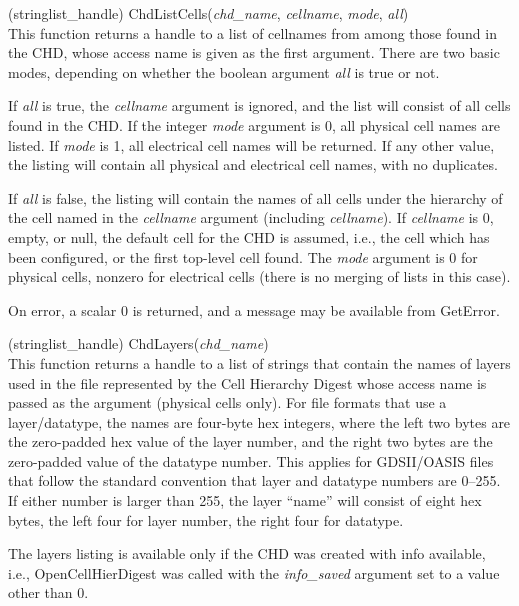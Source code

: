 \begin{description}
\item{(stringlist\_handle) \vt ChdListCells({\it chd\_name\/},
 {\it cellname\/}, {\it mode\/}, {\it all\/})}\\
This function returns a handle to a list of cellnames from among those
found in the CHD, whose access name is given as the first argument. 
There are two basic modes, depending on whether the boolean argument
{\it all} is true or not.

If {\it all} is true, the {\it cellname} argument is ignored, and the
list will consist of all cells found in the CHD.  If the integer {\it
mode} argument is 0, all physical cell names are listed.  If {\it
mode} is 1, all electrical cell names will be returned.  If any other
value, the listing will contain all physical and electrical cell
names, with no duplicates.

If {\it all} is false, the listing will contain the names of all cells
under the hierarchy of the cell named in the {\it cellname} argument
(including {\it cellname}).  If {\it cellname} is 0, empty, or null,
the default cell for the CHD is assumed, i.e., the cell which has been
configured, or the first top-level cell found.  The {\it mode}
argument is 0 for physical cells, nonzero for electrical cells (there
is no merging of lists in this case).

On error, a scalar 0 is returned, and a message may be available
from {\vt GetError}.

\item{(stringlist\_handle) \vt ChdLayers({\it chd\_name\/})}\\
This function returns a handle to a list of strings that contain the
names of layers used in the file represented by the Cell Hierarchy
Digest whose access name is passed as the argument (physical cells
only).  For file formats that use a layer/datatype, the names are
four-byte hex integers, where the left two bytes are the zero-padded
hex value of the layer number, and the right two bytes are the
zero-padded value of the datatype number.  This applies for
GDSII/OASIS files that follow the standard convention that layer and
datatype numbers are 0--255.  If either number is larger than 255, the
layer ``name'' will consist of eight hex bytes, the left four for
layer number, the right four for datatype.

The layers listing is available only if the CHD was created with info
available, i.e., {\vt OpenCellHierDigest} was called with the {\it
info\_saved} argument set to a value other than 0.


\end{description}
